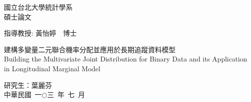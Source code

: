 
\usepackage{wallpaper}                                          			%


\fontsize{12}{22pt}\selectfont
 \begin{center}
    \huge 國立台北大學統計學系 \\ 碩士論文
 \end{center}
\vspace*{2cm}
 \begin{center}
    \LARGE 指導教授: 黃怡婷~~博士 \\
 \end{center}
\vspace*{2cm}
 \begin{center}
    \LARGE 建構多變量二元聯合機率分配並應用於長期追蹤資料模型\\
         Building the Multivariate Joint Distribution for Binary Data and its Application in Longitudinal Marginal Model
 \end{center}
\vspace*{5cm}
\begin{center}
    \LARGE 研究生：葉麗芬 \\
    \LARGE 中華民國~一$\bigcirc$三~年~七~月
\end{center}

\newpage

\newpage					
\fontsize{12}{22pt}\selectfont %
\fancyfoot[C]{\thepage}

\setcounter{tocdepth}{2}		%
\tableofcontents
\newpage
\renewcommand{\numberline}[1]{\loflabel~#1\hspace*{1em}}%
\listoffigures %
\newpage
\renewcommand{\numberline}[1]{\lotlabel~#1\hspace*{1em}}%
\listoftables %

\cleardoublepage
{}          %
\setcounter{page}{1}
\ifodd{} \else \thispagestyle{empty}\mbox{}\clearpage\fi          %
\ifodd{} \else \thispagestyle{empty}\mbox{}\clearpage\fi
\ifodd{} \else \thispagestyle{empty}\mbox{}\clearpage\fi
\ifodd{} \else \thispagestyle{empty}\mbox{}\clearpage\fi

